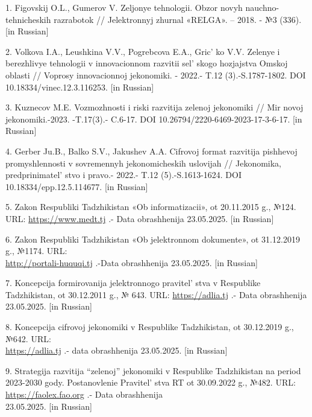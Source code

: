 \begin{references}
1. Figovskij O.L., Gumerov V. Zeljonye tehnologii. Obzor novyh
nauchno-tehnicheskih razrabotok // Jelektronnyj zhurnal «RELGA». --
2018. - №3 (336). {[}in Russian{]}

2. Volkova I.A., Leushkina V.V., Pogrebcova E.A., Gric' ko
V.V. Zelenye i berezhlivye tehnologii v innovacionnom razvitii
sel' skogo hozjajstva Omskoj oblasti // Voprosy
innovacionnoj jekonomiki. - 2022.- T.12 (3).-S.1787-1802. DOI
10.18334/vinec.12.3.116253. {[}in Russian{]}

3. Kuznecov M.E. Vozmozhnosti i riski razvitija zelenoj jekonomiki // Mir
novoj jekonomiki.-2023. -T.17(3).- C.6-17. DOI
10.26794/2220-6469-2023-17-3-6-17. {[}in Russian{]}

4. Gerber Ju.B., Balko S.V., Jakushev A.A. Cifrovoj format razvitija
pishhevoj promyshlennosti v sovre\-mennyh jekonomicheskih uslovijah //
Jekonomika, predprinimatel' stvo i pravo.- 2022.- T.12
(5).-S.1613-1624. DOI 10.18334/epp.12.5.114677. {[}in Russian{]}

5. Zakon Respubliki Tadzhikistan «Ob informatizacii», ot 20.11.2015 g.,
№124. URL:
\href{https://www.medt.tj/documents/main/normativno-pravovie-akti/zakonodatelnie-akti/ru/02518-ru.pdf}{https://www.medt.tj} .-
Data obrashhenija 23.05.2025. {[}in Russian{]}

6. Zakon Respubliki Tadzhikistan «Ob jelektronnom dokumente», ot
31.12.2019 g., №1174. URL:\\
\href{http://portali-huquqi.tj/publicadliya/view\_qonunhoview.php/showdetail=\&asosi\_id=1763}{http://portali-huquqi.tj}
.-Data obrashhenija 23.05.2025. {[}in Russian{]}

7. Koncepcija formirovanija jelektronnogo pravitel' stva v
Respublike Tadzhikistan, ot 30.12.2011 g., № 643. URL:
\href{https://adlia.tj/show\_doc.fwx?rgn=116092}{https://adlia.tj} .- Data obrashhenija
23.05.2025. {[}in Russian{]}

8. Koncepcija cifrovoj jekonomiki v Respublike Tadzhikistan, ot
30.12.2019 g., №642. URL: \\\href{https://adlia.tj/show\_doc.fwx?rgn=135392}{https://adlia.tj} .-
data obrashhenija 23.05.2025. {[}in Russian{]}

9. Strategija razvitija ``zelenoj'' jekonomiki v Respublike Tadzhikistan
na period 2023-2030 gody. Postan\-ovlenie Pravitel' stva RT
ot 30.09.2022 g., №482. URL:
\href{https://faolex.fao.org/docs/pdf/taj221507.pdf}{https://faolex.fao.org} .- Data obrashhenija\\
23.05.2025. {[}in Russian{]}
\end{references}

